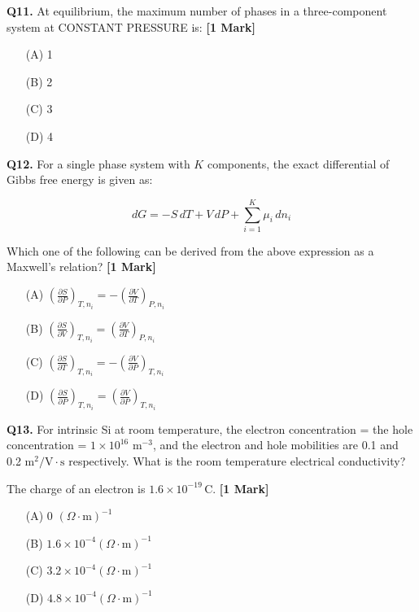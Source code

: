 \documentclass[11pt]{article}
\newcommand{\questiona}[2]{
    \noindent\textbf{Q#2.} #1 \hfill \textbf{[1 Mark]}
}
\begin{document}
\questiona{At equilibrium, the maximum number of phases in a three-component system at CONSTANT PRESSURE is:}{11}
\begin{enumerate}
    \item[(A)] 1  
    \item[(B)] 2  
    \item[(C)] 3  
    \item[(D)] 4  
\end{enumerate}
\vspace{0.5cm}

\questiona{For a single phase system with \(K\) components, the exact differential of Gibbs free energy is given as:  

\[
dG = -S\,dT + V\,dP + \sum_{i=1}^{K} \mu_i\,dn_i
\]

Which one of the following can be derived from the above expression as a Maxwell’s relation?}{12}
\begin{enumerate}
    \item[(A)] \(\left( \frac{\partial S}{\partial P} \right)_{T, n_i} = -\left( \frac{\partial V}{\partial T} \right)_{P, n_i}\)  
    \item[(B)] \(\left( \frac{\partial S}{\partial V} \right)_{T, n_i} = \left( \frac{\partial V}{\partial T} \right)_{P, n_i}\)  
    \item[(C)] \(\left( \frac{\partial S}{\partial T} \right)_{T, n_i} = -\left( \frac{\partial V}{\partial P} \right)_{T, n_i}\)  
    \item[(D)] \(\left( \frac{\partial S}{\partial P} \right)_{T, n_i} = \left( \frac{\partial V}{\partial P} \right)_{T, n_i}\)  
\end{enumerate}
\vspace{0.5cm}

\questiona{For intrinsic Si at room temperature, the electron concentration = the hole concentration = \(1 \times 10^{16} \text{ m}^{-3}\), and the electron and hole mobilities are 0.1 and 0.2 \(\text{m}^2/\text{V}\cdot\text{s}\) respectively. What is the room temperature electrical conductivity?  

The charge of an electron is \(1.6 \times 10^{-19}\,\text{C}\).}{13}
\begin{enumerate}
    \item[(A)] 0 \((\Omega\cdot\text{m})^{-1}\)  
    \item[(B)] \(1.6 \times 10^{-4} (\Omega\cdot\text{m})^{-1}\)  
    \item[(C)] \(3.2 \times 10^{-4} (\Omega\cdot\text{m})^{-1}\)  
    \item[(D)] \(4.8 \times 10^{-4} (\Omega\cdot\text{m})^{-1}\)  
\end{enumerate}
\vspace{0.5cm}
\end{document}
